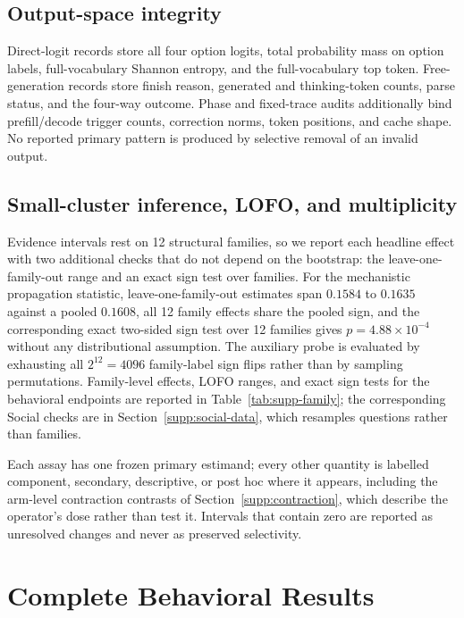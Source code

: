 \documentclass[letterpaper]{article}
\begin{document}
\subsection{Output-space integrity}

Direct-logit records store all four option logits, total probability mass on option labels, full-vocabulary Shannon entropy, and the full-vocabulary top token.  Free-generation records store finish reason, generated and thinking-token counts, parse status, and the four-way outcome.  Phase and fixed-trace audits additionally bind prefill/decode trigger counts, correction norms, token positions, and cache shape.  No reported primary pattern is produced by selective removal of an invalid output.

\subsection{Small-cluster inference, LOFO, and multiplicity}

Evidence intervals rest on 12 structural families, so we report each headline effect with two additional checks that do not depend on the bootstrap: the leave-one-family-out range and an exact sign test over families. For the mechanistic propagation statistic, leave-one-family-out estimates span $0.1584$ to $0.1635$ against a pooled $0.1608$, all 12 family effects share the pooled sign, and the corresponding exact two-sided sign test over 12 families gives $p=4.88\times10^{-4}$ without any distributional assumption. The auxiliary probe is evaluated by exhausting all $2^{12}=4096$ family-label sign flips rather than by sampling permutations. Family-level effects, LOFO ranges, and exact sign tests for the behavioral endpoints are reported in Table~\ref{tab:supp-family}; the corresponding Social checks are in Section~\ref{supp:social-data}, which resamples questions rather than families.

Each assay has one frozen primary estimand; every other quantity is labelled component, secondary, descriptive, or post hoc where it appears, including the arm-level contraction contrasts of Section~\ref{supp:contraction}, which describe the operator's dose rather than test it. Intervals that contain zero are reported as unresolved changes and never as preserved selectivity.

\section{Complete Behavioral Results}
\label{supp:behavior}
\end{document}
